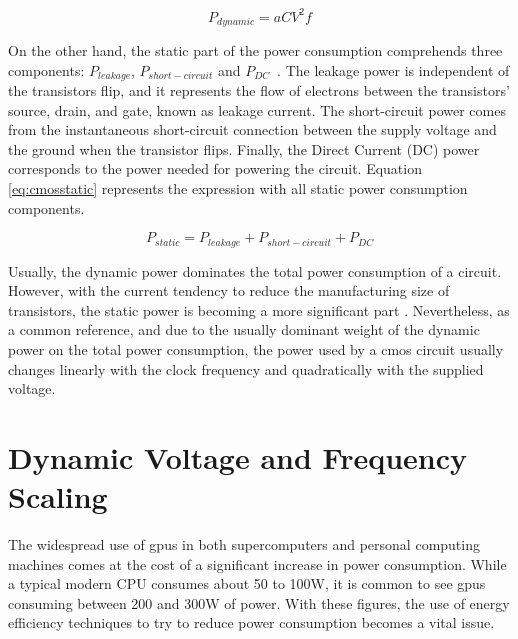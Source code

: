 \begin{equation}
    P_{dynamic} = aCV^2f
    \label{eq:dynpower}
\end{equation}

On the other hand, the static part of the power consumption comprehends three components: $P_{leakage}$, $P_{short-circuit}$ and $P_{DC}$~\cite{mei_survey_2016}. The leakage power is independent of the transistors flip, and it represents the flow of electrons between the transistors' source, drain, and gate, known as leakage current. The short-circuit power comes from the instantaneous short-circuit connection between the supply voltage and the ground when the transistor flips. Finally, the Direct Current (DC) power corresponds to the power needed for powering the circuit. Equation \ref{eq:cmosstatic} represents the expression with all static power consumption components.

\begin{equation}
    P_{static} = P_{leakage} + P_{short-circuit} + P_{DC}
    \label{eq:cmosstatic}
\end{equation}

Usually, the dynamic power dominates the total power consumption of a circuit. However, with the current tendency to reduce the manufacturing size of transistors, the static power is becoming a more significant part \cite{s._hong_modeling_2012,hong_integrated_2010}. Nevertheless, as a common reference, and due to the usually dominant weight of the dynamic power on the total power consumption, the power used by a \acrshort{cmos} circuit usually changes linearly with the clock frequency and quadratically with the supplied voltage.


\section{Dynamic Voltage and Frequency Scaling}
\label{section:DVFS}

The widespread use of \acrshort{gpu}s in both supercomputers and personal computing machines comes at the cost of a significant increase in power consumption. While a typical modern CPU consumes about 50 to 100W, it is common to see \acrshort{gpu}s consuming between 200 and 300W of power. With these figures, the use of energy efficiency techniques to try to reduce power consumption becomes a vital issue.

